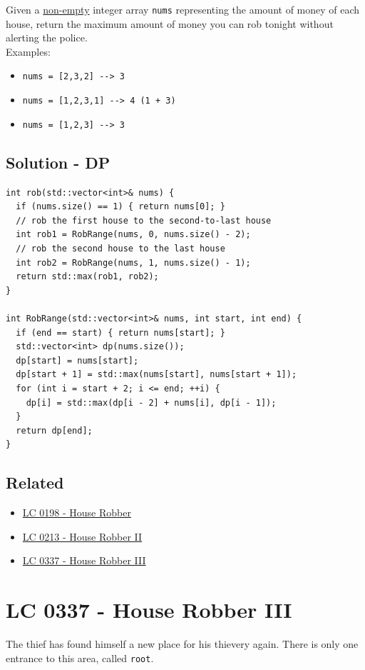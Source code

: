 Given a \ul{non-empty} integer array {\colorbox{CodeBackground}{\lstinline|nums|}} representing the amount of money of each house, return the maximum amount of money you can rob tonight without alerting the police.\\

Examples:
\begin{itemize}
\item {\colorbox{CodeBackground}{\lstinline|nums = [2,3,2] --> 3|}}
\item {\colorbox{CodeBackground}{\lstinline|nums = [1,2,3,1] --> 4 (1 + 3)|}}
\item {\colorbox{CodeBackground}{\lstinline|nums = [1,2,3] --> 3|}}
\end{itemize}

\subsection*{Solution - DP}
\begin{lstlisting}
int rob(std::vector<int>& nums) {
  if (nums.size() == 1) { return nums[0]; }
  // rob the first house to the second-to-last house
  int rob1 = RobRange(nums, 0, nums.size() - 2);
  // rob the second house to the last house
  int rob2 = RobRange(nums, 1, nums.size() - 1);
  return std::max(rob1, rob2);
}

int RobRange(std::vector<int>& nums, int start, int end) {
  if (end == start) { return nums[start]; }
  std::vector<int> dp(nums.size());
  dp[start] = nums[start];
  dp[start + 1] = std::max(nums[start], nums[start + 1]);
  for (int i = start + 2; i <= end; ++i) {
    dp[i] = std::max(dp[i - 2] + nums[i], dp[i - 1]);
  }
  return dp[end];
}
\end{lstlisting}

\subsection*{Related}
\begin{itemize}
\item \hyperref[lc0198]{LC 0198 - House Robber}
\item \hyperref[lc0213]{LC 0213 - House Robber II}
\item \hyperref[lc0337]{LC 0337 - House Robber III}
\end{itemize}

\section{LC 0337 - House Robber III}\label{lc0337}
The thief has found himself a new place for his thievery again. There is only one entrance to this area, called {\colorbox{CodeBackground}{\lstinline|root|}}.\\

